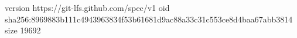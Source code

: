 version https://git-lfs.github.com/spec/v1
oid sha256:8969883b111c4943963834f53b61681d9ac88a33c31c553ce8d4baa67abb3814
size 19692

